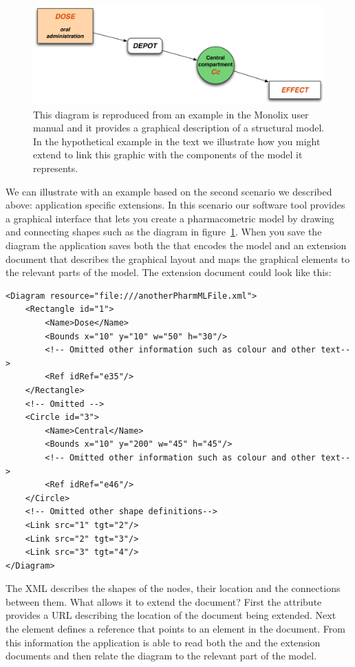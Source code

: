 \begin{figure}[htb]
\centering
  \includegraphics[height=0.2\textheight]{Figures/GraphicalModel}
  \caption{This diagram is reproduced from an example in the Monolix
    user manual \cite{Monolix4.1.4UserGuide:2012} and it provides a
    graphical description of a structural model. In the hypothetical
    example in the text we illustrate how you might extend \pharmml to
    link this graphic with the components of the model it represents.}
\label{fig:graphical-model}
\end{figure}

We can illustrate with an example based on the second scenario we
described above: application specific extensions. In this scenario our
software tool provides a graphical interface that lets you create a
pharmacometric model by drawing and connecting shapes such as the
diagram in figure~\ref{fig:graphical-model}. When you save the diagram
the application saves both the \pharmml that encodes the model and an
extension document that describes the graphical layout and maps the
graphical elements to the relevant parts of the model. The extension
document could look like this:
%
\lstset{language=XML}
\begin{lstlisting}
<Diagram resource="file:///anotherPharmMLFile.xml">
    <Rectangle id="1">
        <Name>Dose</Name>
        <Bounds x="10" y="10" w="50" h="30"/>
        <!-- Omitted other information such as colour and other text-->
        <Ref idRef="e35"/>
    </Rectangle>
    <!-- Omitted -->
    <Circle id="3">
        <Name>Central</Name>
        <Bounds x="10" y="200" w="45" h="45"/>
        <!-- Omitted other information such as colour and other text-->
        <Ref idRef="e46"/>
    </Circle>
    <!-- Omitted other shape definitions-->
    <Link src="1" tgt="2"/>
    <Link src="2" tgt="3"/>
    <Link src="3" tgt="4"/>
</Diagram>
\end{lstlisting}
%
The XML describes the shapes of the nodes, their location and the
connections between them. What allows it to extend the \pharmml document?
First the  attribute provides a URL describing
the location of the \pharmml document being extended. Next the
 element defines a reference that points to an element in
the \pharmml document. From this information the application is able
to read both the \pharmml and the extension documents and then relate
the diagram to the relevant part of the model.

